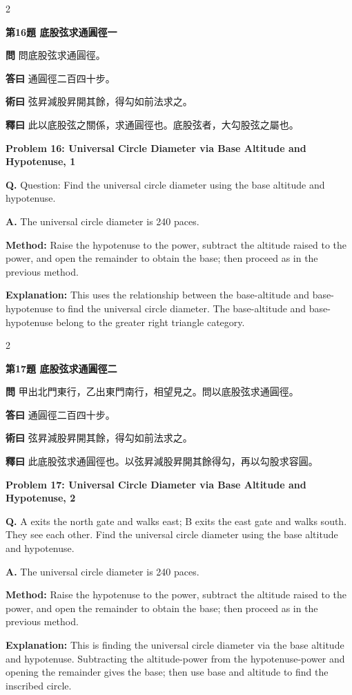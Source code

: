 \documentclass[11pt,a4paper]{article}
\newcommand{\wen}[1]{\noindent\textbf{問} #1\par\smallskip}
\newcommand{\da}[1]{\noindent\textbf{答曰} #1\par\smallskip}
\newcommand{\shu}[1]{\noindent\textbf{術曰} #1\par\smallskip}
\newcommand{\shi}[1]{\noindent\textbf{釋曰} #1\par\smallskip}
\newcommand{\wenE}[1]{\noindent\textbf{Q.} #1\par\smallskip}
\newcommand{\daE}[1]{\noindent\textbf{A.} #1\par\smallskip}
\newcommand{\shuE}[1]{\noindent\textbf{Method:} #1\par\smallskip}
\newcommand{\shiE}[1]{\noindent\textbf{Explanation:} #1\par\smallskip}
\begin{document}
\bigskip

\begin{paracol}{2}

\noindent\textbf{第16題 底股弦求通圓徑一}

\wen{問底股弦求通圓徑。}
\da{通圓徑二百四十步。}
\shu{弦昇減股昇開其餘，得勾如前法求之。}
\shi{此以底股弦之關係，求通圓徑也。底股弦者，大勾股弦之屬也。}

\switchcolumn

\noindent\textbf{Problem 16: Universal Circle Diameter via Base Altitude and Hypotenuse, 1}

\wenE{Question: Find the universal circle diameter using the base altitude and hypotenuse.}
\daE{The universal circle diameter is 240 paces.}
\shuE{Raise the hypotenuse to the power, subtract the altitude raised to the power, and open the remainder to obtain the base; then proceed as in the previous method.}
\shiE{This uses the relationship between the base-altitude and base-hypotenuse to find the universal circle diameter. The base-altitude and base-hypotenuse belong to the greater right triangle category.}

\end{paracol}

\bigskip

\begin{paracol}{2}

\noindent\textbf{第17題 底股弦求通圓徑二}

\wen{甲出北門東行，乙出東門南行，相望見之。問以底股弦求通圓徑。}
\da{通圓徑二百四十步。}
\shu{弦昇減股昇開其餘，得勾如前法求之。}
\shi{此底股弦求通圓徑也。以弦昇減股昇開其餘得勾，再以勾股求容圓。}

\switchcolumn

\noindent\textbf{Problem 17: Universal Circle Diameter via Base Altitude and Hypotenuse, 2}

\wenE{A exits the north gate and walks east; B exits the east gate and walks south. They see each other. Find the universal circle diameter using the base altitude and hypotenuse.}
\daE{The universal circle diameter is 240 paces.}
\shuE{Raise the hypotenuse to the power, subtract the altitude raised to the power, and open the remainder to obtain the base; then proceed as in the previous method.}
\shiE{This is finding the universal circle diameter via the base altitude and hypotenuse. Subtracting the altitude-power from the hypotenuse-power and opening the remainder gives the base; then use base and altitude to find the inscribed circle.}

\end{paracol}
\end{document}
